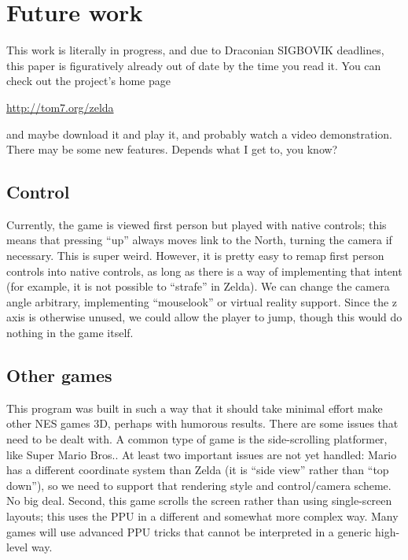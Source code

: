 \documentclass[twocolumn]{article}
\begin{document}
\section{Future work}

This work is literally in progress, and due to Draconian SIGBOVIK
deadlines, this paper is figuratively already out of date by the time
you read it. You can check out the project's home page

\medskip
\begin{center}
\url{http://tom7.org/zelda}
\end{center}
\medskip

and maybe download it and play it, and probably watch a video
demonstration. There may be some new features. Depends what I
get to, you know?

\subsection{Control}
Currently, the game is viewed first person but played with native
controls; this means that pressing ``up'' always moves link to the
North, turning the camera if necessary. This is super weird. However,
it is pretty easy to remap first person controls into native controls,
as long as there is a way of implementing that intent (for example, it
is not possible to ``strafe'' in Zelda). We can change the camera
angle arbitrary, implementing ``mouselook'' or virtual reality
support. Since the z axis is otherwise unused, we could allow the player
to jump, though this would do nothing in the game itself.

\subsection{Other games}
This program was built in such a way that it should take minimal
effort make other NES games 3D, perhaps with humorous results. There
are some issues that need to be dealt with. A common type of game is
the side-scrolling platformer, like Super Mario Bros.. At least two
important issues are not yet handled: Mario has a different coordinate
system than Zelda (it is ``side view'' rather than ``top down''), so
we need to support that rendering style and control/camera scheme. No
big deal. Second, this game scrolls the screen rather than using
single-screen layouts; this uses the PPU in a different and somewhat
more complex way. Many games will use advanced PPU tricks that cannot
be interpreted in a generic high-level way.
\end{document}
